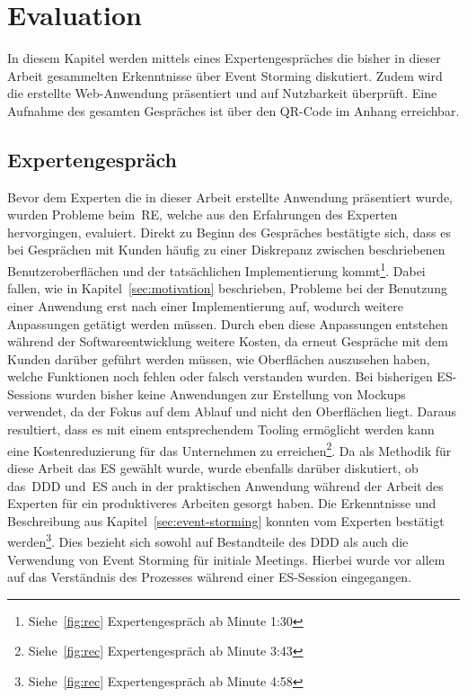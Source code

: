 \chapter{Evaluation}\label{ch:evaluation}
In diesem Kapitel werden mittels eines Expertengespräches die bisher in dieser Arbeit gesammelten Erkenntnisse über Event Storming diskutiert.
Zudem wird die erstellte Web-Anwendung präsentiert und auf Nutzbarkeit überprüft.
Eine Aufnahme des gesamten Gespräches ist über den QR-Code im Anhang erreichbar.

\section{Expertengespräch}\label{sec:expertengespraech}
Bevor dem Experten die in dieser Arbeit erstellte Anwendung präsentiert wurde, wurden Probleme beim~\ac{RE}, welche aus den Erfahrungen des Experten
hervorgingen, evaluiert.
Direkt zu Beginn des Gespräches bestätigte sich, dass es bei Gesprächen mit Kunden häufig zu einer Diskrepanz zwischen beschriebenen Benutzeroberflächen und der
tatsächlichen Implementierung kommt\footnote{Siehe~\ref{fig:rec} Expertengespräch ab Minute 1:30}.
Dabei fallen, wie in Kapitel~\ref{sec:motivation} beschrieben, Probleme bei der Benutzung einer Anwendung erst nach einer Implementierung auf, wodurch
weitere Anpassungen getätigt werden müssen.
Durch eben diese Anpassungen entstehen während der Softwareentwicklung weitere Kosten, da erneut Gespräche mit dem Kunden darüber geführt werden müssen,
wie Oberflächen auszusehen haben, welche Funktionen noch fehlen oder falsch verstanden wurden.
Bei bisherigen \ac{ES}-Sessions wurden bisher keine Anwendungen zur Erstellung von Mockups verwendet, da der Fokus auf dem Ablauf und nicht den Oberflächen liegt.
Daraus resultiert, dass es mit einem entsprechendem Tooling ermöglicht werden kann eine Kostenreduzierung für das Unternehmen zu erreichen\footnote{Siehe~\ref{fig:rec} Expertengespräch ab Minute  3:43}.\newline
Da als Methodik für diese Arbeit das \ac{ES} gewählt wurde, wurde ebenfalls darüber diskutiert, ob das~\ac{DDD} und~\ac{ES} auch in der praktischen
Anwendung während der Arbeit des Experten für ein produktiveres Arbeiten gesorgt haben.
Die Erkenntnisse und Beschreibung aus Kapitel~\ref{sec:event-storming} konnten vom Experten bestätigt werden\footnote{Siehe~\ref{fig:rec} Expertengespräch ab Minute  4:58}.
Dies bezieht sich sowohl auf Bestandteile des \ac{DDD} als auch die Verwendung von Event Storming für initiale Meetings.
Hierbei wurde vor allem auf das Verständnis des Prozesses während einer \ac{ES}-Session eingegangen.
